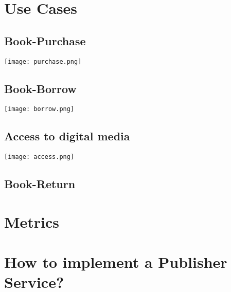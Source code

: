 \section{Use Cases}
\subsection{Book-Purchase}

\vspace{0.3cm}
\texttt{[image: purchase.png]}
\subsection{Book-Borrow}
\vspace{0.3cm}
\texttt{[image: borrow.png]}


\subsection{Access to digital media \label{sssec:access}}
\vspace{0.3cm}
\texttt{[image: access.png]}


\subsection{Book-Return}

\section{Metrics}

\section{How to implement a Publisher Service?}

